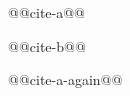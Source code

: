 \documentclass{article}
\begin{document}
@@cite-a@@ \cite{alpha2000}\par
@@cite-b@@ \cite{beta2001}\par
@@cite-a-again@@ \cite{alpha2000}\par
\end{document}
